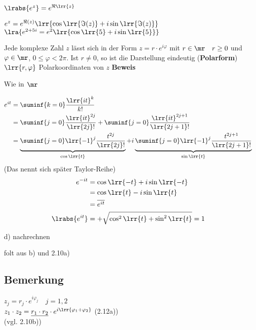 		\item $\lrabs{e^z}=e^{\Re\lrr{z}}$
		\item $e^z=e^{\Re(z)}\lrr{\cos\lrr{\Im(z)}+i\sin\lrr{\Im(z)}}$\\
			$\lra{e^{2+5i}=e^2\lrr{\cos\lrr{5}+i\sin\lrr{5}}}$
		\item Jede komplexe Zahl $z$ lässt sich in der Form $z=r\cdot e^{i\varphi}$ mit $r\in\mr\quad r\geq 0$ und $\varphi\in\mr$, $0\leq\varphi <2\pi$. Ist $r\neq 0$, so ist die Darstellung eindeutig (\textbf{Polarform})\\
			$\lrr{r,\varphi}$ Polarkoordinaten von $z$
	\subExEnd
	\textbf{Beweis}
		\item Wie in $\mr$
		\item 
			\begin{align*}
				e^{it}&=\suminf{k=0}\frac{\lrr{it}^k}{k!}\\
				&=\suminf{j=0}\frac{\lrr{it}^{2j}}{\lrr{2j}!}+\suminf{j=0}\frac{\lrr{it}^{2j+1}}{\lrr{2j+1}!}\\
				&=\underbrace{\suminf{j=0}\lrr{-1}^j\frac{t^{2j}}{\lrr{2j}!}}_{\cos\lrr{t}}+i\underbrace{\suminf{j=0}\lrr{-1}^j\frac{t^{2j+1}}{\lrr{2j+1}!}}_{\sin\lrr{t}}
			\end{align*}
			(Das nennt sich später Taylor-Reihe)
			\begin{align*}
				e^{-it}&=\cos\lrr{-t}+i\sin\lrr{-t}\\
				&=\cos\lrr{t}-i\sin\lrr{t}\\
				&=\overline{e^{it}}\\
				\lrabs{e^{it}}&=+\sqrt{\cos^2\lrr{t}+\sin^2\lrr{t}}=1
			\end{align*}
		\item d) nachrechnen
		\item folt aus b) und 2.10a)
	\subExEnd
	
\subsection{Bemerkung}
	$z_j=r_j\cdot e^{i\varphi_j}\quad j=1,2$\\
	$z_1\cdot z_2=\underline{r_1\cdot r_2}\cdot e^{i\lrr{\varphi_1+\varphi_2}}$ (2.12a))\\
	(vgl. 2.10b))

